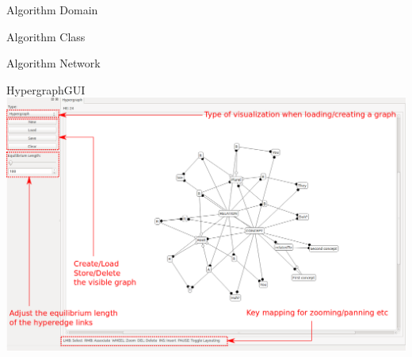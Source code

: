 \documentclass[pdf]
{beamer}
\begin{document}
\begin{frame}{Algorithm Domain}
	\centering
	
\end{frame}

\begin{frame}{Algorithm Class}
	\centering
	
\end{frame}

\begin{frame}{Algorithm Network}
	\centering
	
\end{frame}




\begin{frame}{HypergraphGUI}
    \centering
    \includegraphics[width=\textwidth]{pics/HypergraphGUI.png}
\end{frame}
\end{document}
